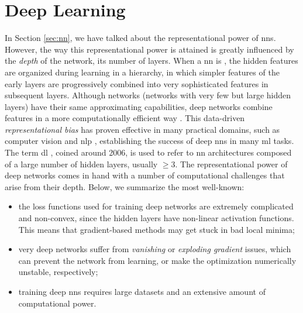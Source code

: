 \section{Deep Learning}
In Section \ref{sec:nn}, we have talked about the representational power of \glspl{nn}. However, the way this representational power is attained is greatly influenced by the \emph{depth} of the network, \ie its number of layers. When a \gls{nn} is , the hidden features are organized during learning in a hierarchy, in which simpler features of the early layers are progressively combined into very sophisticated features in subsequent layers. Although  networks (networks with very few but large hidden layers) have their same approximating capabilities, deep networks combine features in a more computationally efficient way \citep{bengio2009deeparch}. This data-driven \emph{representational bias} has proven effective in many practical domains, such as computer vision \citep{krizhevsky2017imagenet} and \gls{nlp} \citep{vaswani2017transformer}, establishing the success of deep \glspl{nn} in many \gls{ml} tasks. The term \gls{dl} \citep{goodfellow2016dl}, coined around 2006, is used to refer to \gls{nn} architectures composed of a large number of hidden layers, usually $\geq 3$. The representational power of deep networks comes in hand with a number of computational challenges that arise from their depth. Below, we summarize the most well-known:
\begin{itemize}
    \item the loss functions used for training deep networks are extremely complicated and non-convex, since the hidden layers have non-linear activation functions. This means that gradient-based methods may get stuck in bad local minima;
    \item very deep networks suffer from \emph{vanishing} or \emph{exploding gradient} issues, which can prevent the network from learning, or make the optimization numerically unstable, respectively;
    \item training deep \glspl{nn} requires large datasets and an extensive amount of computational power.
\end{itemize}
